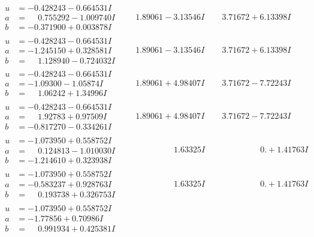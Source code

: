 \documentclass[1p]{elsarticle_modified}
\theoremstyle{definition}
\begin{document}
$$\begin{array}{c|c|c}
\begin{aligned}
u &= -0.428243 - 0.664531 I \\
a &= \phantom{-}0.755292 - 1.009740 I \\
b &= -0.371900 + 0.003878 I\end{aligned}
 & \phantom{-}1.89061 - 3.13546 I & \phantom{-}3.71672 + 6.13398 I \\ \hline\begin{aligned}
u &= -0.428243 - 0.664531 I \\
a &= -1.245150 + 0.328581 I \\
b &= \phantom{-}1.128940 - 0.724032 I\end{aligned}
 & \phantom{-}1.89061 - 3.13546 I & \phantom{-}3.71672 + 6.13398 I \\ \hline\begin{aligned}
u &= -0.428243 - 0.664531 I \\
a &= -1.09300 - 1.05874 I \\
b &= \phantom{-}1.06242 + 1.34996 I\end{aligned}
 & \phantom{-}1.89061 + 4.98407 I & \phantom{-}3.71672 - 7.72243 I \\ \hline\begin{aligned}
u &= -0.428243 - 0.664531 I \\
a &= \phantom{-}1.92783 + 0.97509 I \\
b &= -0.817270 - 0.334261 I\end{aligned}
 & \phantom{-}1.89061 + 4.98407 I & \phantom{-}3.71672 - 7.72243 I \\ \hline\begin{aligned}
u &= -1.073950 + 0.558752 I \\
a &= \phantom{-}0.124813 - 1.010030 I \\
b &= -1.214610 + 0.323938 I\end{aligned}
 & \phantom{-0.000000 -}1.63325 I & \phantom{-0.000000 -}0. + 1.41763 I \\ \hline\begin{aligned}
u &= -1.073950 + 0.558752 I \\
a &= -0.583237 + 0.928763 I \\
b &= \phantom{-}0.193738 + 0.326753 I\end{aligned}
 & \phantom{-0.000000 -}1.63325 I & \phantom{-0.000000 -}0. + 1.41763 I \\ \hline\begin{aligned}
u &= -1.073950 + 0.558752 I \\
a &= -1.77856 + 0.70986 I \\
b &= \phantom{-}0.991934 + 0.425381 I\end{aligned}

\end{array}$$
\end{document}
